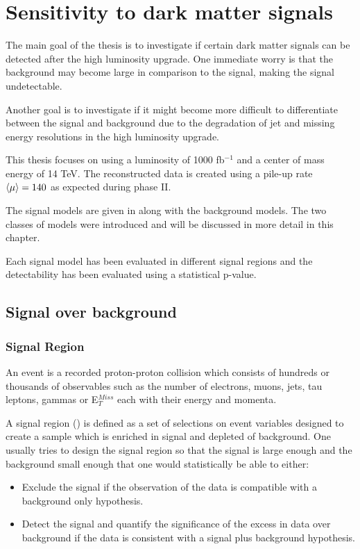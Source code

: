 \chapter{Sensitivity to dark matter signals}\label{cha:darkmatter}

The main goal of the thesis is to investigate if certain dark matter signals can be detected after the high luminosity upgrade. One immediate worry is that the background may become large in comparison to the signal, making the signal undetectable.

Another goal is to investigate if it might become more difficult to differentiate between the signal and background due to the degradation of jet and missing energy resolutions in the high luminosity upgrade.

This thesis focuses on using a luminosity of 1000 fb$^{-1}$ and a center of mass energy of 14 TeV. The reconstructed data is created using a pile-up rate $\left<\mu\right> = 140$ as expected during phase II.

The signal models are given in  along with the background models. The two classes of models were introduced  and will be discussed in more detail in this chapter.

Each signal model has been evaluated in different signal regions and the detectability has been evaluated using a statistical p-value. 

\newpage
\section{Signal over background}
\subsection{Signal Region}
An event is a recorded proton-proton collision which consists of hundreds or thousands of observables such as the number of electrons, muons, jets, tau leptons, gammas or E$^{Miss}_T$ each with their energy and momenta.

A signal region (\abbrSR) is defined as a set of selections on event variables designed to create a sample which is enriched in signal and depleted of background. One usually tries to design the signal region so that the signal is large enough and the background small enough that one would statistically be able to either:
\begin{itemize}
\item Exclude the signal if the observation of the data is compatible with a background only hypothesis.
\item Detect the signal and quantify the significance of the excess in data over background if the data is consistent with a signal plus background hypothesis.
\end{itemize}

